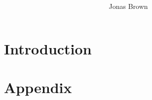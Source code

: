 \documentclass[9pt]{extreport}
\title{
    \begin{center}
        \reallybigtenb{MTH2005}

        \reallybigtenb{Case Study 1}
    \end{center}
}
\author{Jonas Brown}
\date{}
\begin{document}
    \maketitle

    \chapter{Introduction}\label{ch:introduction}
    

    

    \chapter{Appendix}\label{ch:appendix}
    
\end{document}
